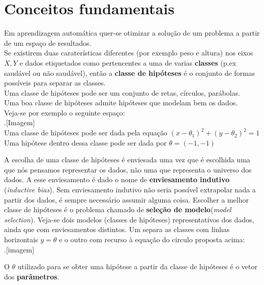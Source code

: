 \documentclass[]{report}
\begin{document}
\section{Conceitos fundamentais}
Em aprendizagem automática quer-se otimizar a solução de um problema a partir de um espaço de resultados.\\
Se existirem duas caraterísticas diferentes (por exemplo peso e altura) nos eixos $X,Y$ e dados etiquetados como pertencentes a uma de varias \textbf{classes} (p.ex saudável ou não saudável), então a \textbf{classe de hipóteses} é o conjunto de formas possíveis para separar as classes.\\
Uma classe de hipóteses pode ser um conjunto de retas, círculos, parábolas.\\
Uma boa classe de hipóteses admite hipóteses que modelam bem os dados.\\[0.2cm]
Veja-se por exemplo o seguinte espaço:\\
.[Imagem]\\[0.2cm]
Uma classe de hipóteses pode ser dada pela equação $(x-\theta_1)^2+(y-\theta_2)^2 = 1$\\
Uma hipótese dentro dessa classe pode ser dada por $\theta=(-1,-1)$\par
A escolha de uma classe de hipóteses é enviesada uma vez que é escolhida uma que nós pensamos representar os dados, não uma que representa o universo dos dados. A esse enviesamento é dado o nome de \textbf{enviesamento indutivo} (\textit{inductive bias}).
Sem enviesamento indutivo não seria possível extrapolar nada a partir dos dados, é sempre necessário assumir alguma coisa.
Escolher a melhor classe de hipóteses é o problema chamado de \textbf{seleção de modelo}(\textit{model selection}).
Veja-se dois modelos (classes de hipóteses) representativos dos dados, ainda que com enviesamentos distintos. Um separa as classes com linhas horizontais $y=\theta$ e o outro com recurso à equação do circulo proposta acima:\\
.[imagem]\par
O $\theta$ utilizado para se obter uma hipótese a partir da classe de hipóteses é o vetor dos \textbf{parâmetros}.
\end{document}
